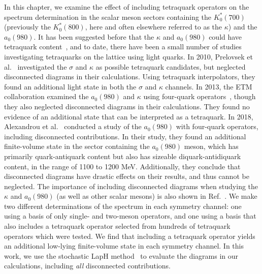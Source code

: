 In this chapter, we examine the effect of including tetraquark operators on the spectrum determination in the scalar meson sectors containing the $K_0^*(700)$ (previously the $K_0^*(800)$, here and often elsewhere referred to as the $\kappa$) and the $a_0(980)$. It has been suggested before that the $\kappa$ and $a_0(980)$ could have tetraquark content~\cite{Jaffe:2004ph, Amsler:2004ps, Close:2002zu, Maiani:2004uc}, and to date, there have been a small number of studies investigating tetraquarks on the lattice using light quarks. In 2010, Prelovsek et al.~\cite{Prelovsek:2010kg} investigated the $\sigma$ and $\kappa$ as possible tetraquark candidates, but neglected disconnected diagrams in their calculations. Using tetraquark interpolators, they found an additional light state in both the $\sigma$ and $\kappa$ channels. In 2013, the ETM collaboration examined the $a_0(980)$ and $\kappa$ using four-quark operators~\cite{Alexandrou:2012rm}, though they also neglected disconnected diagrams in their calculations. They found no evidence of an additional state that can be interpreted as a tetraquark. In 2018, Alexandrou et al.~\cite{Alexandrou:2017itd} conducted a study of the $a_0(980)$ with four-quark operators, including disconnected contributions. In their study, they found an additional finite-volume state in the sector containing the $a_0(980)$ meson, which has primarily quark-antiquark content but also has sizeable diquark-antidiquark content, in the range of 1100 to 1200 MeV. Additionally, they conclude that disconnected diagrams have drastic effects on their results, and thus cannot be neglected. The importance of including disconnected diagrams when studying the $\kappa$ and $a_0(980)$ (as well as other scalar mesons) is also shown in Ref.~\cite{Guo:2013nja}. We make two different determinations of the spectrum in each symmetry channel: one using a basis of only single- and two-meson operators, and one using a basis that also includes a tetraquark operator selected from hundreds of tetraquark operators which were tested. We find that including a tetraquark operator yields an additional low-lying finite-volume state in each symmetry channel. In this work, we use the stochastic LapH method~\cite{Morningstar:2011ka} to evaluate the diagrams in our calculations, including \textit{all} disconnected contributions.
